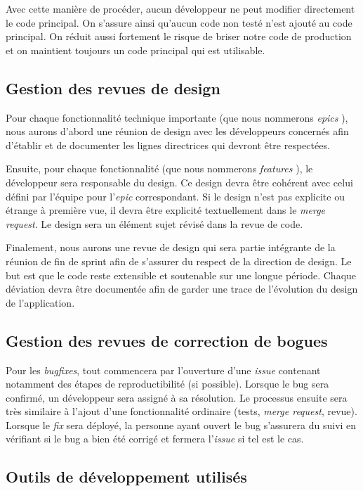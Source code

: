 	Avec cette manière de procéder, aucun développeur ne peut modifier directement le code principal. On s’assure ainsi qu’aucun code non testé n’est ajouté au code principal. On réduit aussi fortement le risque de briser notre code de production et on maintient toujours un code principal qui est utilisable. 
	
	\subsection{Gestion des revues de design}
	Pour chaque fonctionnalité technique importante (que nous nommerons \og \emph{epics} \fg{}), nous aurons d’abord une réunion de design avec les développeurs concernés afin d’établir et de documenter les lignes directrices qui devront être respectées. 

	Ensuite, pour chaque fonctionnalité (que nous nommerons \og \emph{features} \fg{}), le développeur sera responsable du design. Ce design devra être cohérent avec celui défini par l’équipe pour l’\emph{epic} correspondant. Si le design n’est pas explicite ou étrange à première vue, il devra être explicité textuellement dans le \emph{merge request}. Le design sera un élément sujet révisé dans la revue de code. 

	Finalement, nous aurons une revue de design qui sera partie intégrante de la réunion de fin de sprint afin de s’assurer du respect de la direction de design. Le but est que le code reste extensible et soutenable sur une longue période. Chaque déviation devra être documentée afin de garder une trace de l’évolution du design de l'application. 

	\subsection{Gestion des revues de correction de bogues}
	Pour les \emph{bugfixes}, tout commencera par l’ouverture d’une \emph{issue} contenant notamment des étapes de reproductibilité (si possible). Lorsque le bug sera confirmé, un développeur sera assigné à sa résolution. Le processus ensuite sera très similaire à l’ajout d’une fonctionnalité ordinaire (tests, \emph{merge request}, revue). Lorsque le \emph{fix} sera déployé, la personne ayant ouvert le bug s’assurera du suivi en vérifiant si le bug a bien été corrigé et fermera l’\emph{issue} si tel est le cas.

	\subsection{Outils de développement utilisés}

